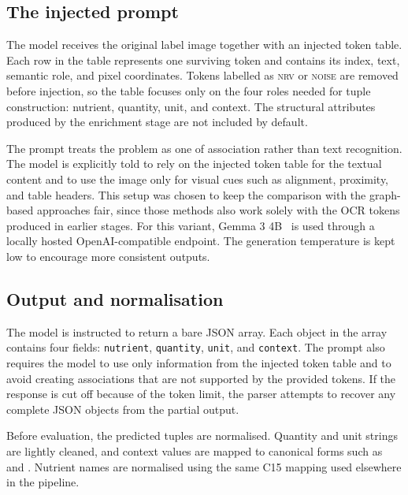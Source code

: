 \subsection{The injected prompt}\label{sec:vlm-assoc-prompt}

The model receives the original label image together with an injected token table. Each row in the table represents one surviving token and contains its index, text, semantic role, and pixel coordinates. Tokens labelled as \textsc{nrv} or \textsc{noise} are removed before injection, so the table focuses only on the four roles needed for tuple construction: nutrient, quantity, unit, and context. The structural attributes produced by the enrichment stage are not included by default.

The prompt treats the problem as one of association rather than text recognition. The model is explicitly told to rely on the injected token table for the textual content and to use the image only for visual cues such as alignment, proximity, and table headers. This setup was chosen to keep the comparison with the graph-based approaches fair, since those methods also work solely with the OCR tokens produced in earlier stages. For this variant, Gemma 3 4B~\cite{gemma3} is used through a locally hosted OpenAI-compatible endpoint. The generation temperature is kept low to encourage more consistent outputs.

\subsection{Output and normalisation}\label{sec:vlm-assoc-output}

The model is instructed to return a bare JSON array. Each object in the array contains four fields: \texttt{nutrient}, \texttt{quantity}, \texttt{unit}, and \texttt{context}. The prompt also requires the model to use only information from the injected token table and to avoid creating associations that are not supported by the provided tokens. If the response is cut off because of the token limit, the parser attempts to recover any complete JSON objects from the partial output.

Before evaluation, the predicted tuples are normalised. Quantity and unit strings are lightly cleaned, and context values are mapped to canonical forms such as  and . Nutrient names are normalised using the same C15 mapping used elsewhere in the pipeline.

